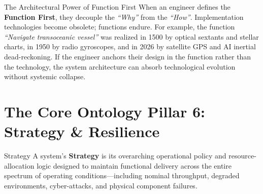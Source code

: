 \begin{takeawaybox}{The Architectural Power of Function First}
When an engineer defines the \textbf{Function First}, they decouple the \textit{``Why''} from the \textit{``How''}. 
Implementation technologies become obsolete; functions endure. 
For example, the function \textit{``Navigate transoceanic vessel''} was realized in 1500 by optical sextants and stellar charts, in 1950 by radio gyroscopes, and in 2026 by satellite GPS and AI inertial dead-reckoning. If the engineer anchors their design in the function rather than the technology, the system architecture can absorb technological evolution without systemic collapse.
\end{takeawaybox}

\section{The Core Ontology Pillar 6: Strategy \& Resilience}
\label{sec:ontology_strategy}

\begin{definitionbox}{Strategy}
A system's \textbf{Strategy} is its overarching operational policy and resource-allocation logic designed to maintain functional delivery across the entire spectrum of operating conditions—including nominal throughput, degraded environments, cyber-attacks, and physical component failures.
\end{definitionbox}

